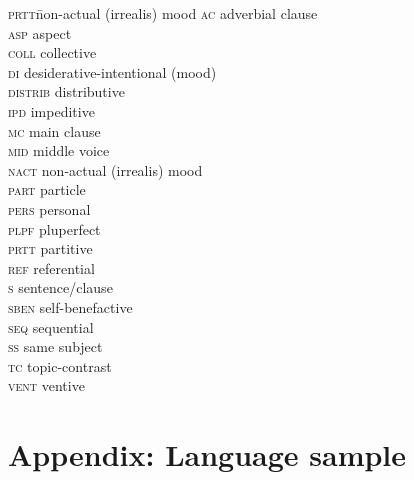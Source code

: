 \documentclass[output=paper]{langsci/langscibook}
\begin{document}
\begin{multicols}{2}
\begin{tabbing}
\textsc{prtt}\hspace{5mm}\=non-actual (irrealis) mood\hspace{5mm}\kill
\textsc{ac}  \>adverbial clause                 \\
\textsc{asp} \> aspect                          \\
\textsc{coll}   \>  collective                  \\
\textsc{di} \>  desiderative-intentional (mood) \\
\textsc{distrib}\>  distributive               \\
\textsc{ipd} \> impeditive                      \\
\textsc{mc}  \> main clause                      \\
\textsc{mid} \> middle voice                    \\
\textsc{nact}\>  non-actual (irrealis) mood     \\
\textsc{part}\>  particle                       \\
\textsc{pers}\>  personal                       \\
\textsc{plpf}\>  pluperfect                     \\
\textsc{prtt}\>  partitive                      \\
\textsc{ref} \> referential                     \\
\textsc{s}  \>    sentence/clause              \\
\textsc{sben}\>  self-benefactive               \\
\textsc{seq} \> sequential                      \\
\textsc{ss} \>  same subject                   \\
\textsc{tc} \>  topic-contrast                  \\
\textsc{vent}\>  ventive                        
\end{tabbing}
\end{multicols}


\section*{Appendix: Language sample}
 
\end{document}
